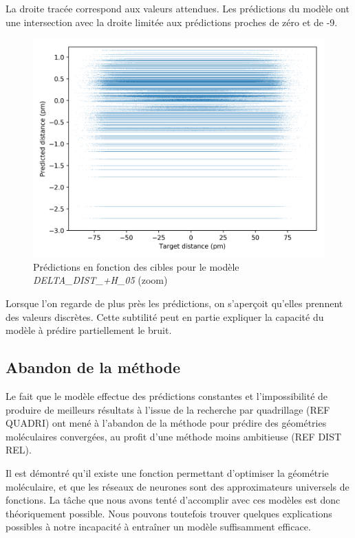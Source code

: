 \par La droite tracée correspond aux valeurs attendues. Les prédictions du modèle ont une intersection avec la droite limitée aux prédictions proches de zéro et de -9.

\begin{figure}[!h]
	\centering
	
	\includegraphics[scale=0.7]{../figures/DELTA_DIST_+H_05/DELTA_DIST+H_05_preds_targets_zoom.png}	
	
	\caption{Prédictions en fonction des cibles pour le modèle \emph{DELTA\_DIST\_+H\_05} (zoom)}
	
\end{figure}
\par Lorsque l'on regarde de plus près les prédictions, on s'aperçoit qu'elles prennent des valeurs discrètes. Cette subtilité peut en partie expliquer la capacité du modèle à prédire partiellement le bruit.

\subsection{Abandon de la méthode}

Le fait que le modèle effectue des prédictions constantes et l'impossibilité de produire de meilleurs résultats à l'issue de la recherche par quadrillage (REF QUADRI) ont mené à l'abandon de la méthode pour prédire des géométries moléculaires convergées, au profit d'une méthode moins ambitieuse (REF DIST REL).\\

\par Il est démontré qu'il existe une fonction permettant d'optimiser la géométrie moléculaire, et que les réseaux de neurones sont des approximateurs universels de fonctions\cite{universal_approx}. La tâche que nous avons tenté d'accomplir avec ces modèles est donc théoriquement possible. Nous pouvons toutefois trouver quelques explications possibles à notre incapacité à entraîner un modèle suffisamment efficace. 


